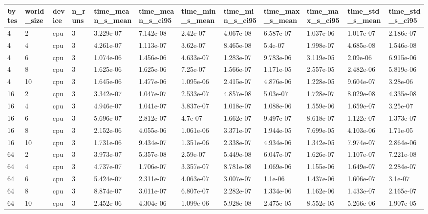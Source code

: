 \begin{tabular}{llllllllllll}
\hline
bytes & world\_size & device & n\_runs & time\_mean\_s\_mean & time\_mean\_s\_ci95 & time\_min\_s\_mean & time\_min\_s\_ci95 & time\_max\_s\_mean & time\_max\_s\_ci95 & time\_std\_s\_mean & time\_std\_s\_ci95 \\
\hline
4 & 2 & cpu & 3 & 3.229e-07 & 7.142e-08 & 2.42e-07 & 4.067e-08 & 6.587e-07 & 1.037e-06 & 1.017e-07 & 2.186e-07 \\
4 & 4 & cpu & 3 & 4.261e-07 & 1.113e-07 & 3.62e-07 & 8.465e-08 & 5.4e-07 & 1.998e-07 & 4.685e-08 & 1.546e-08 \\
4 & 6 & cpu & 3 & 1.074e-06 & 1.456e-06 & 4.633e-07 & 1.283e-07 & 9.783e-06 & 3.119e-05 & 2.09e-06 & 6.915e-06 \\
4 & 8 & cpu & 3 & 1.625e-06 & 1.625e-06 & 7.25e-07 & 1.566e-07 & 1.171e-05 & 2.557e-05 & 2.482e-06 & 5.819e-06 \\
4 & 10 & cpu & 3 & 1.645e-06 & 1.477e-06 & 1.095e-06 & 2.415e-07 & 4.876e-06 & 1.228e-05 & 9.604e-07 & 3.28e-06 \\
16 & 2 & cpu & 3 & 3.342e-07 & 1.047e-07 & 2.533e-07 & 4.857e-08 & 5.03e-07 & 1.728e-07 & 8.029e-08 & 4.335e-08 \\
16 & 4 & cpu & 3 & 4.946e-07 & 1.041e-07 & 3.837e-07 & 1.018e-07 & 1.088e-06 & 1.559e-06 & 1.659e-07 & 3.25e-07 \\
16 & 6 & cpu & 3 & 5.696e-07 & 2.812e-07 & 4.7e-07 & 1.662e-07 & 9.497e-07 & 8.618e-07 & 1.122e-07 & 1.373e-07 \\
16 & 8 & cpu & 3 & 2.152e-06 & 4.055e-06 & 1.061e-06 & 3.371e-07 & 1.944e-05 & 7.699e-05 & 4.103e-06 & 1.71e-05 \\
16 & 10 & cpu & 3 & 1.731e-06 & 9.434e-07 & 1.351e-06 & 2.338e-07 & 4.934e-06 & 1.342e-05 & 7.974e-07 & 2.864e-06 \\
64 & 2 & cpu & 3 & 3.973e-07 & 5.357e-08 & 2.59e-07 & 5.449e-08 & 6.047e-07 & 1.626e-07 & 1.107e-07 & 7.221e-08 \\
64 & 4 & cpu & 3 & 4.737e-07 & 1.706e-07 & 3.357e-07 & 8.781e-08 & 1.069e-06 & 1.155e-06 & 1.649e-07 & 2.284e-07 \\
64 & 6 & cpu & 3 & 5.424e-07 & 2.311e-07 & 4.063e-07 & 3.007e-07 & 1.1e-06 & 1.437e-06 & 1.606e-07 & 3.1e-07 \\
64 & 8 & cpu & 3 & 8.874e-07 & 3.011e-07 & 6.807e-07 & 2.282e-07 & 1.334e-06 & 1.162e-06 & 1.433e-07 & 2.165e-07 \\
64 & 10 & cpu & 3 & 2.452e-06 & 4.304e-06 & 1.099e-06 & 5.928e-08 & 2.475e-05 & 8.552e-05 & 5.266e-06 & 1.907e-05 \\

\end{tabular}
